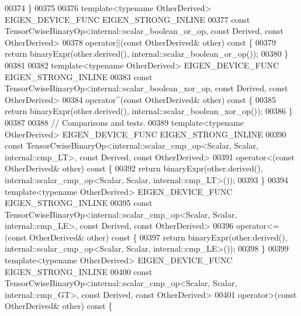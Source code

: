 \begin{DoxyCode}
00374     \}
00375 
00376     \textcolor{keyword}{template}<\textcolor{keyword}{typename} OtherDerived> EIGEN\_DEVICE\_FUNC EIGEN\_STRONG\_INLINE
00377     \textcolor{keyword}{const} TensorCwiseBinaryOp<internal::scalar\_boolean\_or\_op, const Derived, const OtherDerived>
00378     operator||(\textcolor{keyword}{const} OtherDerived& other)\textcolor{keyword}{ const }\{
00379       \textcolor{keywordflow}{return} binaryExpr(other.derived(), internal::scalar\_boolean\_or\_op());
00380     \}
00381 
00382     \textcolor{keyword}{template}<\textcolor{keyword}{typename} OtherDerived> EIGEN\_DEVICE\_FUNC EIGEN\_STRONG\_INLINE
00383     \textcolor{keyword}{const} TensorCwiseBinaryOp<internal::scalar\_boolean\_xor\_op, const Derived, const OtherDerived>
00384     operator^(\textcolor{keyword}{const} OtherDerived& other)\textcolor{keyword}{ const }\{
00385       \textcolor{keywordflow}{return} binaryExpr(other.derived(), internal::scalar\_boolean\_xor\_op());
00386     \}
00387 
00388     \textcolor{comment}{// Comparisons and tests.}
00389     \textcolor{keyword}{template}<\textcolor{keyword}{typename} OtherDerived> EIGEN\_DEVICE\_FUNC EIGEN\_STRONG\_INLINE
00390     \textcolor{keyword}{const} TensorCwiseBinaryOp<internal::scalar\_cmp\_op<Scalar, Scalar, internal::cmp\_LT>, \textcolor{keyword}{const} Derived, \textcolor{keyword}{
      const} OtherDerived>
00391     operator<(\textcolor{keyword}{const} OtherDerived& other)\textcolor{keyword}{ const }\{
00392       \textcolor{keywordflow}{return} binaryExpr(other.derived(), internal::scalar\_cmp\_op<Scalar, Scalar, internal::cmp\_LT>());
00393     \}
00394     \textcolor{keyword}{template}<\textcolor{keyword}{typename} OtherDerived> EIGEN\_DEVICE\_FUNC EIGEN\_STRONG\_INLINE
00395     \textcolor{keyword}{const} TensorCwiseBinaryOp<internal::scalar\_cmp\_op<Scalar, Scalar, internal::cmp\_LE>, \textcolor{keyword}{const} Derived, \textcolor{keyword}{
      const} OtherDerived>
00396     operator<=(\textcolor{keyword}{const} OtherDerived& other)\textcolor{keyword}{ const }\{
00397       \textcolor{keywordflow}{return} binaryExpr(other.derived(), internal::scalar\_cmp\_op<Scalar, Scalar, internal::cmp\_LE>());
00398     \}
00399     \textcolor{keyword}{template}<\textcolor{keyword}{typename} OtherDerived> EIGEN\_DEVICE\_FUNC EIGEN\_STRONG\_INLINE
00400     \textcolor{keyword}{const} TensorCwiseBinaryOp<internal::scalar\_cmp\_op<Scalar, Scalar, internal::cmp\_GT>, \textcolor{keyword}{const} Derived, \textcolor{keyword}{
      const} OtherDerived>
00401     operator>(\textcolor{keyword}{const} OtherDerived& other)\textcolor{keyword}{ const }\{

\end{DoxyCode}
